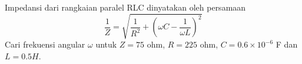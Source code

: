 \begin{soal}
Impedansi dari rangkaian paralel RLC dinyatakan oleh persamaan
\begin{equation*}
\frac{1}{Z} = \sqrt{\frac{1}{R^2} + \left(
\omega C - \frac{1}{\omega L}
\right)^2}
\end{equation*}
Cari frekuensi angular $\omega$ untuk $Z=75$ ohm,
$R=225$ ohm,
$C = 0.6 \times 10^{-6}$ F
dan $L = 0.5 H$.
\end{soal}

